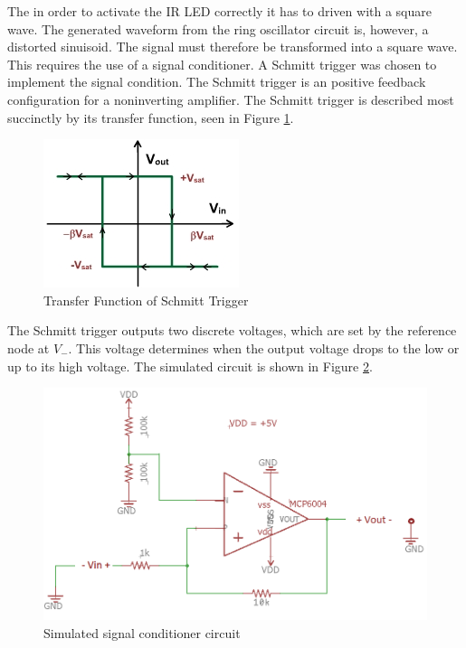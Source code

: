 
The in order to activate the IR LED correctly it has to driven with a square wave. The generated waveform from the ring oscillator circuit is, however, a distorted sinuisoid. The signal must therefore be transformed into a square wave. This requires the use of a signal conditioner. A Schmitt trigger was chosen to implement the signal condition. 
The Schmitt trigger is an positive feedback configuration for a noninverting amplifier. The Schmitt trigger is described most succinctly by its transfer function, seen in Figure \ref{fig:schmitttransfer}.

\begin{figure}[H]
	\centering
	\includegraphics[width=0.45\linewidth]{CircuitDevelopment/schmitttransfer}
	\caption[Transfer function of Schmitt Trigger]{Transfer Function of Schmitt Trigger \cite{schmitt}}
	\label{fig:schmitttransfer}
\end{figure}
The Schmitt trigger outputs two discrete voltages, which are set by the reference node at $V_-$. This voltage determines when the output voltage drops to the low or up to its high voltage. The simulated circuit is shown in Figure \ref{fig:signalconditionersimulationschem}.

\begin{figure}[H]
	\centering
	\includegraphics[width=0.6\linewidth]{CIrcuitDevelopment/SignalConditionerSimulationSchem}
	\caption[Simulated signal conditioner circuit]{Simulated signal conditioner circuit}
	\label{fig:signalconditionersimulationschem}
\end{figure}

